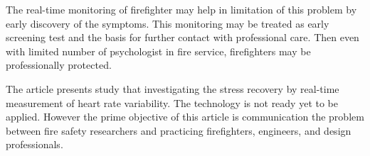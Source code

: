 \documentclass[twocolumn]{svjour3}
\begin{document}
The real-time monitoring of firefighter may help in limitation of this problem by early discovery of the symptoms. This monitoring may be treated as early screening test and the basis for further contact with professional care. Then even with limited number of psychologist in fire service, firefighters may be professionally protected.

The article presents study that investigating the stress recovery by real-time measurement of heart rate variability. The technology is not ready yet to be applied. However the prime objective of this article is communication the problem between fire safety researchers and practicing firefighters, engineers, and design professionals.



\end{document}
